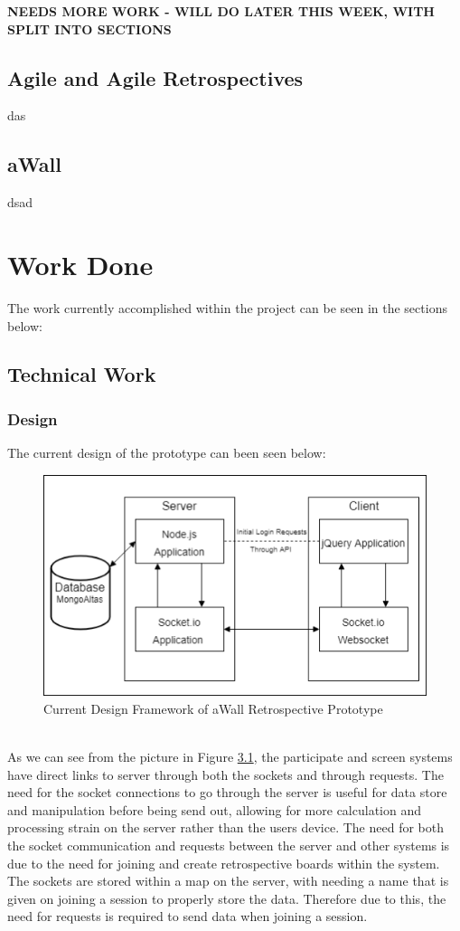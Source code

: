 \documentclass[11pt
              , a4paper
              , twoside
              , openright
              ]{report}
\begin{document}
\textbf{NEEDS MORE WORK - WILL DO LATER THIS WEEK, WITH SPLIT INTO SECTIONS}
\section{Agile and Agile Retrospectives}
das
\section{aWall}
dsad

\chapter{Work Done}\label{C:workdone}
The work currently accomplished within the project can be seen in the sections below:
\section{Technical Work}
\subsection{Design}
The current design of the prototype can been seen below:
\begin{figure}[ht]
	\centering
	\includegraphics{arch_diagram}
	\caption{Current Design Framework of aWall Retrospective Prototype} \label{fig:archDiagram}
\end{figure}
\\
As we can see from the picture in Figure \ref{fig:archDiagram}, the participate and screen systems have direct links to server through both the sockets and through requests. The need for the socket connections to go through the server is useful for data store and manipulation before being send out, allowing for more calculation and processing strain on the server rather than the users device. 
The need for both the socket communication and requests between the server and other systems is due to the need for joining and create retrospective boards within the system. The sockets are stored within a map on the server, with needing a name that is given on joining a session to properly store the data. Therefore due to this, the need for requests is required to send data when joining a session.
\end{document}

